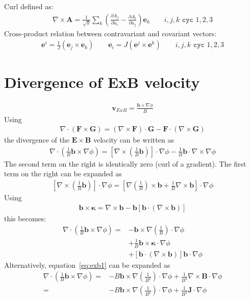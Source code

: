 \documentclass[12pt]{article}
\newcommand{\ve}[1]{\ensuremath{\boldsymbol{#1}}}
\begin{document}
%
Curl defined as:
%
\begin{align*}
\nabla\times\mathbf{A} = \frac{1}{\sqrt{g}}\sum_k\left(\frac{\partial 
A_j}{\partial u_i} - \frac{\partial A_i}{\partial u_j}\right)\ve{e}_k \qquad 
i,j,k \texttt{ cyc } 1,2,3
\end{align*}
%
Cross-product relation between contravariant and covariant vectors:
%
\begin{align*}
\ve{e}^i = \frac{1}{J}\left(\ve{e}_j \times \ve{e}_k\right) \qquad 
\ve{e}_i = J\left(\ve{e}^j \times \ve{e}^k\right) \qquad i,j,k 
\texttt{ cyc } 1,2,3
\end{align*}



\section{Divergence of ExB velocity}
%
\begin{align*}
\ve{v}_{ExB} = \frac{\ve{b}\times\nabla\phi}{B}
\end{align*}
%
Using
%
\begin{align*}
\nabla\cdot\left(\ve{F}\times\ve{G}\right) = 
\left(\nabla\times\ve{F}\right)\cdot\ve{G} - 
\ve{F}\cdot\left(\nabla\times\ve{G}\right)
\end{align*}
%
the divergence of the $\ve{E}\times\ve{B}$ velocity
can be written as
%
\begin{align}
\nabla\cdot\left(\frac{1}{B}\ve{b}\times\nabla\phi\right) = 
\left[\nabla\times\left(\frac{1}{B}\ve{b}\right)\right]\cdot\nabla\phi - 
\frac{1}{B}\ve{b}\cdot\nabla\times\nabla\phi
\label{eq:exb1}
\end{align}
%
The second term on the right is identically zero (curl of a gradient). The 
first term on the right can be expanded as
%
\begin{align*}
\left[\nabla\times\left(\frac{1}{B}\ve{b}\right)\right]\cdot\nabla\phi = 
\left[\nabla\left(\frac{1}{B}\right)\times\ve{b} + 
\frac{1}{B}\nabla\times\ve{b}\right]\cdot\nabla\phi
\end{align*}
%
Using
%
\begin{align*}
\ve{b}\times\ve{\kappa} = \nabla\times\ve{b} - 
\ve{b}\left[\ve{b}\cdot\left(\nabla\times\ve{b}\right)\right]
\end{align*}
%
this becomes:
%
\begin{align*}
  \nabla\cdot\left(\frac{1}{B}\ve{b}\times\nabla\phi\right) = 
&-\ve{b}\times\nabla\left(\frac{1}{B}\right)\cdot\nabla\phi \\
  &+ \frac{1}{B}\ve{b}\times\ve{\kappa}\cdot\nabla\phi \\
  &+ 
\left[\ve{b}\cdot\left(\nabla\times\ve{b}\right)\right]\ve{b}\cdot\nabla\phi
\end{align*}
%
Alternatively, equation~\ref{eq:exb1} can be expanded as
%
\begin{align*}
  \nabla\cdot\left(\frac{1}{B}\ve{b}\times\nabla\phi\right) =& 
-B\ve{b}\times\nabla\left(\frac{1}{B^2}\right)\cdot\nabla\phi + 
\frac{1}{B^2}\nabla\times\ve{B}\cdot\nabla\phi \\
  =& -B\ve{b}\times\nabla\left(\frac{1}{B^2}\right)\cdot\nabla\phi + 
\frac{1}{B^2}\ve{J}\cdot\nabla\phi
\end{align*}
%
\end{document}
